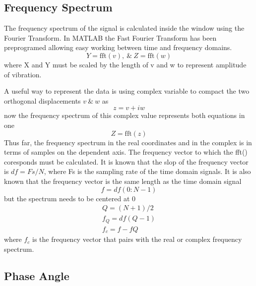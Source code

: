 \subsection{Frequency Spectrum}
The frequency spectrum of the signal is calculated inside the window using the Fourier Transform. In MATLAB the Fast Fourier Transform has been preprogramed allowing easy working between time and frequency domains.
\begin{equation}\label{eq:FFTReal}
Y = \text{fft}(v),\ \&\ Z = \text{fft}(w)
\end{equation}
where X and Y must be scaled by the length of v and w to represent amplitude of vibration.\par 
A useful way to represent the data is using complex variable to compact the two orthogonal displacements $ v\ \&\ w $ as
\begin{equation}\label{eq:ComplexDisplacement}
z = v + iw
\end{equation}
now the frequency spectrum of this complex value represents both equations in one
\begin{equation}\label{eq:FFTComplex}
Z = \text{fft}(z)
\end{equation}
Thus far, the frequency spectrum in the real coordinates and in the complex is in terms of samples on the dependent axis. The frequency vector to which the fft() coresponds must be calculated. It is known that the slop of the frequency vector is $ df=Fs/N $, where Fs is the sampling rate of the time domain signals. It is also known that the frequency vector is the same length as the time domain signal 
\begin{equation*}
f=df(0:N-1)
\end{equation*}
but the spectrum needs to be centered at 0
\begin{equation*}
\begin{array}{c}
Q=(N+1)/2\\
f_Q=df(Q-1)\\
f_c=f-fQ
\end{array}
\end{equation*}
where $ f_c $ is the frequency vector that pairs with the real or complex frequency spectrum.
\subsection{Phase Angle}
